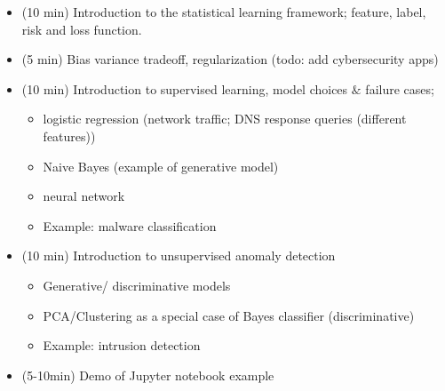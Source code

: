 \documentclass[12pt]{article}
\renewcommand{\_}{\kern-1.5pt\textunderscore\kern-1.5pt}
\begin{document}
\begin{itemize}
	\item (10 min) Introduction to the statistical learning framework; feature, label, risk and loss function.\par

	\item (5 min) Bias variance tradeoff, regularization (todo: add cybersecurity apps)\par

	\item (10 min) Introduction to supervised learning, model choices $\&$  failure cases;\par

\begin{itemize}
	\item logistic regression (network traffic; DNS response queries (different features))\par

	\item Naive Bayes (example of generative model)\par

	\item neural network\par

	\item Example: malware classification\par


\end{itemize}
	\item (10 min) Introduction to unsupervised anomaly detection\par

\begin{itemize}
	\item Generative/ discriminative models\par

	\item PCA/Clustering as a special case of Bayes classifier (discriminative)\par

	\item Example: intrusion detection\par


\end{itemize}
	\item (5-10min) Demo of Jupyter notebook example
\end{itemize}\par


\vspace{\baselineskip}
\end{document}
